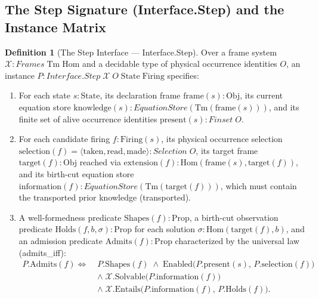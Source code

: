 \documentclass[11pt,a4paper]{article}
\theoremstyle{definition}
\newtheorem{definition}[theorem]{Definition}
\DeclareRobustCommand{\lean}[1]{%
  \ifmmode\text{\normalfont\ttfamily\footnotesize\detokenize{#1}}%
  \else{\normalfont\footnotesize\leanurl{#1}}\fi}
\def\lean#1{#1}%
\begin{document}
\subsection{The Step Signature (\lean{Interface.Step}) and the Instance Matrix}

\begin{definition}[The Step Interface --- \lean{Interface.Step}]
\label{def:step}
Over a frame system $\mathcal{X} : \lean{Frames}\;\mathrm{Tm}\;\mathrm{Hom}$ and a decidable type of physical occurrence identities $O$, an instance $P : \lean{Interface.Step}\;\mathcal{X}\;O\;\mathrm{State}\;\mathrm{Firing}$ specifies:
\begin{enumerate}[leftmargin=2em, nosep]
  \item For each state $s : \mathrm{State}$, its declaration frame $\mathrm{frame}(s) : \mathrm{Obj}$, its current equation store $\mathrm{knowledge}(s) : \lean{EquationStore}(\mathrm{Tm}(\mathrm{frame}(s)))$, and its finite set of alive occurrence identities $\mathrm{present}(s) : \lean{Finset}\;O$.
  \item For each candidate firing $f : \mathrm{Firing}(s)$, its physical occurrence selection $\mathrm{selection}(f) = \langle \mathrm{taken}, \mathrm{read}, \mathrm{made} \rangle : \lean{Selection}\;O$, its target frame $\mathrm{target}(f) : \mathrm{Obj}$ reached via $\mathrm{extension}(f) : \mathrm{Hom}(\mathrm{frame}(s), \mathrm{target}(f))$, and its birth-cut equation store $\mathrm{information}(f) : \lean{EquationStore}(\mathrm{Tm}(\mathrm{target}(f)))$, which must contain the transported prior knowledge (\lean{transported}).
  \item A well-formedness predicate $\mathrm{Shapes}(f) : \mathrm{Prop}$, a birth-cut observation predicate $\mathrm{Holds}(f, b, \sigma) : \mathrm{Prop}$ for each solution $\sigma : \mathrm{Hom}(\mathrm{target}(f), b)$, and an admission predicate $\mathrm{Admits}(f) : \mathrm{Prop}$ characterized by the universal law (\lean{admits_iff}):
  \begin{equation}
  \label{eq:admits-iff}
  \begin{aligned}
  P.\mathrm{Admits}(f) \iff\;& P.\mathrm{Shapes}(f)
    \;\land\; \mathrm{Enabled}\big(P.\mathrm{present}(s),\, P.\mathrm{selection}(f)\big) \\
    &\land\; \mathcal{X}.\mathrm{Solvable}\big(P.\mathrm{information}(f)\big) \\
    &\land\; \mathcal{X}.\mathrm{Entails}\big(P.\mathrm{information}(f),\, P.\mathrm{Holds}(f)\big).
  \end{aligned}

\end{equation}
\end{enumerate}
\end{definition}
\end{document}
